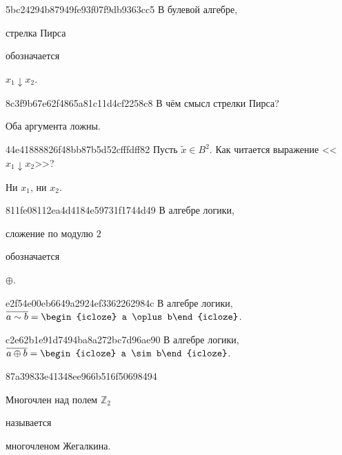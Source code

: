 \begin{note}{5bc24294b87949fe93f07f9db9363cc5}
    В булевой алгебре, \begin{icloze}{2}стрелка Пирса\end{icloze} обозначается \begin{icloze}{1}\({ x_1 \downarrow x_2 }\).\end{icloze}
\end{note}

\begin{note}{8c3f9b67e62f4865a81c11d4cf2258c8}
    В чём смысл стрелки Пирса?

    \begin{cloze}{1}
        Оба аргумента ложны.
    \end{cloze}
\end{note}

\begin{note}{44e41888826f48bb87b5d52cfffdff82}
    Пусть \({ \widetilde x \in B^2 }\).
    Как читается выражение <<\({ x_1 \downarrow x_2 }\)>>?

    \begin{cloze}{1}
        Ни \({ x_1 }\), ни \({ x_2 }\).
    \end{cloze}
\end{note}

\begin{note}{811fe08112ea4d4184e59731f1744d49}
    В алгебре логики, \begin{icloze}{2}сложение по модулю \({ 2 }\)\end{icloze} обозначается \begin{icloze}{1}\({ \oplus }\).\end{icloze}
\end{note}

\begin{note}{e2f54e00eb6649a2924ef3362262984c}
    В алгебре логики, \({ \overline{a \sim b} = \begin{icloze}{1}a \oplus b\end{icloze} }\).
\end{note}

\begin{note}{c2e62b1e91d7494ba8a272bc7d96ae90}
    В алгебре логики, \({ \overline{a \oplus b} = \begin{icloze}{1}a \sim b\end{icloze} }\).
\end{note}

\begin{note}{87a39833e41348ee966b516f50698494}
    \begin{icloze}{2}Многочлен над полем \({ \mathbb Z_2 }\)\end{icloze} называется \begin{icloze}{1}многочленом Жегалкина.\end{icloze}
\end{note}


